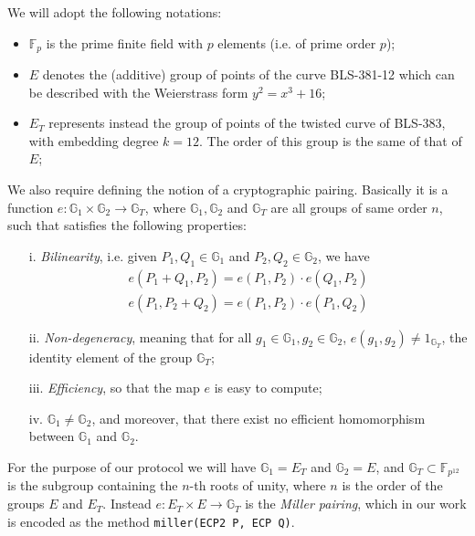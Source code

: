 \documentclass[conference]{IEEEtran}
\begin{document}
We will adopt the following notations:
\begin{itemize}
    \item $\mathbb{F}_p$ is the prime finite field with $p$ elements (i.e. of prime order $p$); %
    \item $E$ denotes the (additive) group of points of the curve BLS-381-12 \cite{bls381-12} which can be described with the Weierstrass form  $y^2=x^3 + 16$;
    \item $E_T$ represents instead the group of points of the twisted curve of BLS-383, with embedding degree $k=12$. The order of this group is the same of that of $E$;
\end{itemize}
We also require defining the notion of a cryptographic pairing. Basically it is a function $e: \mathbb{G}_1\times\mathbb{G}_2\to \mathbb{G}_T$, where $\mathbb{G}_1,\mathbb{G}_2$ and $\mathbb{G}_T$ are all groups of same order $n$, such that satisfies the following properties:
\begin{itemize}
    \item [i.] \emph{Bilinearity}, i.e. given $P_1,Q_1\in\mathbb{G}_1$ and $P_2,Q_2\in\mathbb{G}_2$, we have
    \begin{align*}
        e(P_1+Q_1,P_2) = e(P_1,P_2)\cdot e(Q_1,P_2) \\
        e(P_1,P_2+Q_2) = e(P_1,P_2)\cdot e(P_1,Q_2)
    \end{align*}
    \item[ii.] \emph{Non-degeneracy}, meaning that for all $g_1\in\mathbb{G}_1, g_2\in\mathbb{G}_2$, $e(g_1,g_2)\ne 1_{\mathbb{G}_T}$, the identity element of the group $\mathbb{G}_T$;
    \item[iii.] \emph{ Efficiency}, so that the map $e$ is easy to compute;
    \item[iv. ] $\mathbb{G}_1\ne \mathbb{G}_2$, and moreover, that there exist no efficient homomorphism between $\mathbb{G}_1$ and $\mathbb{G}_2$.
\end{itemize}
For the purpose of our protocol we will have $\mathbb{G}_1 = E_T$ and $\mathbb{G}_2 = E$, and $\mathbb{G}_T\subset \mathbb{F}_{p^{12}}$ is the subgroup containing the $n$-th roots of unity, where $n$ is the order of the groups $E$ and $E_T$. Instead $e: E_T  \times E\to \mathbb{G}_T$ is the \emph{Miller pairing}, which in our work is encoded as the method \verb!miller(ECP2 P, ECP Q)!. \\



\end{document}
